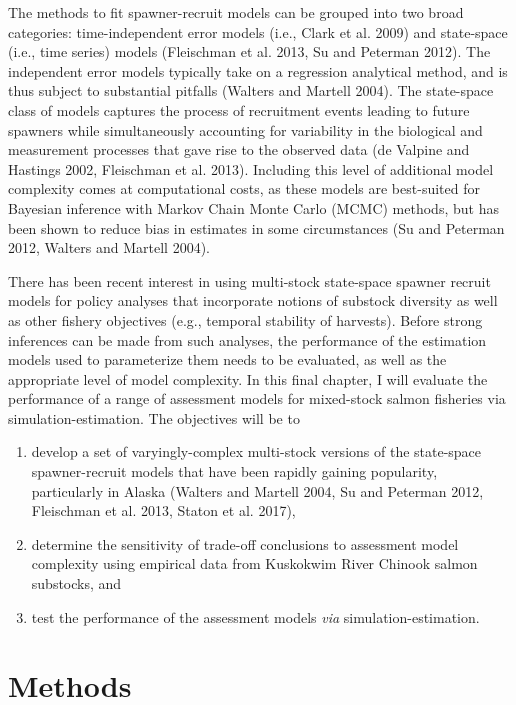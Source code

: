 \documentclass[12pt,]{book}
\theoremstyle{definition}
\theoremstyle{definition}
\theoremstyle{definition}
\theoremstyle{remark}
\begin{document}
The methods to fit spawner-recruit models can be grouped into two broad
categories: time-independent error models (i.e., Clark et al. 2009) and
state-space (i.e., time series) models (Fleischman et al. 2013, Su and
Peterman 2012). The independent error models typically take on a
regression analytical method, and is thus subject to substantial
pitfalls (Walters and Martell 2004). The state-space class of models
captures the process of recruitment events leading to future spawners
while simultaneously accounting for variability in the biological and
measurement processes that gave rise to the observed data (de Valpine
and Hastings 2002, Fleischman et al. 2013). Including this level of
additional model complexity comes at computational costs, as these
models are best-suited for Bayesian inference with Markov Chain Monte
Carlo (MCMC) methods, but has been shown to reduce bias in estimates in
some circumstances (Su and Peterman 2012, Walters and Martell 2004).

There has been recent interest in using multi-stock state-space spawner
recruit models for policy analyses that incorporate notions of substock
diversity as well as other fishery objectives (e.g., temporal stability
of harvests). Before strong inferences can be made from such analyses,
the performance of the estimation models used to parameterize them needs
to be evaluated, as well as the appropriate level of model complexity.
In this final chapter, I will evaluate the performance of a range of
assessment models for mixed-stock salmon fisheries via
simulation-estimation. The objectives will be to

\begin{enumerate}
\def\labelenumi{(\arabic{enumi})}
\item
  develop a set of varyingly-complex multi-stock versions of the
  state-space spawner-recruit models that have been rapidly gaining
  popularity, particularly in Alaska (Walters and Martell 2004, Su and
  Peterman 2012, Fleischman et al. 2013, Staton et al. 2017),
\item
  determine the sensitivity of trade-off conclusions to assessment model
  complexity using empirical data from Kuskokwim River Chinook salmon
  substocks, and
\item
  test the performance of the assessment models \emph{via}
  simulation-estimation.
\end{enumerate}

\section{Methods}\label{methods}
\end{document}
